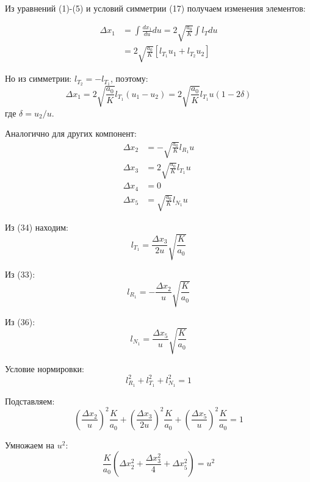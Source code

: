 \documentclass[12pt]{article}
\begin{document}
Из уравнений (1)-(5) и условий симметрии (17) получаем изменения элементов:

\begin{align}
\Delta x_1 &= \int \frac{dx_1}{du} du = 2\sqrt{\frac{a_0}{K}} \int l_T du \\
&= 2\sqrt{\frac{a_0}{K}} [l_{T_1} u_1 + l_{T_2} u_2]
\end{align}

Но из симметрии: $l_{T_2} = -l_{T_1}$, поэтому:
\begin{equation}
\Delta x_1 = 2\sqrt{\frac{a_0}{K}} l_{T_1} (u_1 - u_2) = 2\sqrt{\frac{a_0}{K}} l_{T_1} u (1 - 2\delta) \tag{32}
\end{equation}
где $\delta = u_2 / u$.

Аналогично для других компонент:
\begin{align}
\Delta x_2 &= -\sqrt{\frac{a_0}{K}} l_{R_1} u \tag{33} \\
\Delta x_3 &= 2\sqrt{\frac{a_0}{K}} l_{T_1} u \tag{34} \\
\Delta x_4 &= 0 \tag{35} \\
\Delta x_5 &= \sqrt{\frac{a_0}{K}} l_{N_1} u \tag{36}
\end{align}

Из (34) находим:
\begin{equation}
l_{T_1} = \frac{\Delta x_3}{2u} \sqrt{\frac{K}{a_0}}
\end{equation}

Из (33):
\begin{equation}
l_{R_1} = -\frac{\Delta x_2}{u} \sqrt{\frac{K}{a_0}}
\end{equation}

Из (36):
\begin{equation}
l_{N_1} = \frac{\Delta x_5}{u} \sqrt{\frac{K}{a_0}}
\end{equation}

Условие нормировки:
\begin{equation}
l_{R_1}^2 + l_{T_1}^2 + l_{N_1}^2 = 1
\end{equation}

Подставляем:
\begin{equation}
\left(\frac{\Delta x_2}{u}\right)^2 \frac{K}{a_0} + \left(\frac{\Delta x_3}{2u}\right)^2 \frac{K}{a_0} + \left(\frac{\Delta x_5}{u}\right)^2 \frac{K}{a_0} = 1
\end{equation}

Умножаем на $u^2$:
\begin{equation}
\frac{K}{a_0} \left(\Delta x_2^2 + \frac{\Delta x_3^2}{4} + \Delta x_5^2\right) = u^2
\end{equation}
\end{document}
